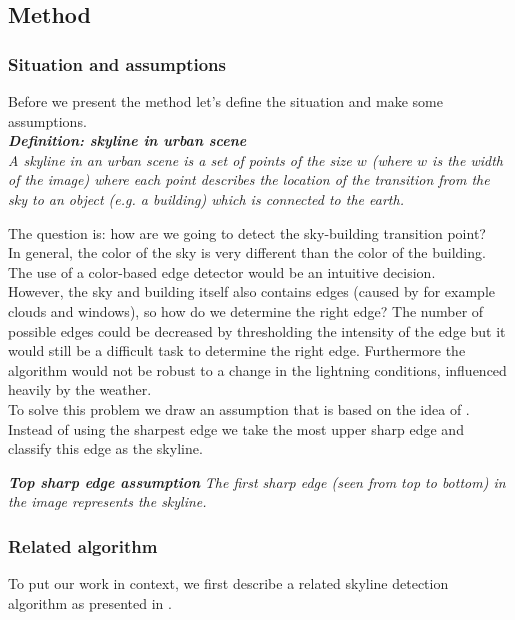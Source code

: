 


\subsection{Method} %
\subsubsection{Situation and assumptions}
Before we present the method let's define the situation and make some
assumptions.\\

\textbf{\emph{Definition: skyline in urban scene}}\\
\emph{A skyline in an urban scene is a set of points of the size $w$ (where $w$ is the
width of the image) where each point describes the location of the
transition from the sky to an object (e.g. a building) which is connected to the
earth.}

The question is: how are we going to detect the sky-building
transition point?\\ 
In general, the color of the sky is very different than the
color of the building. The use of a color-based edge detector would be an
intuitive decision.\\
However, the sky and building itself also contains edges (caused by for example
clouds and windows), so how do we determine the right edge?
The number of possible edges could be decreased by thresholding the intensity of
the edge but it would still be a difficult task to determine the right edge.
Furthermore the algorithm would not be robust to a change in
the lightning conditions, influenced heavily by the weather.\\

To solve this problem we draw an assumption that is based on the
idea of \cite{Rover}. Instead of using the sharpest edge we take the most upper sharp
edge and classify this edge as the skyline.

\textbf{\emph{Top sharp edge assumption}}
\emph{The first sharp edge (seen from top to bottom) in the image 
represents the skyline.}

\subsubsection{Related algorithm}
To put our work in context, we first describe a related skyline detection algorithm as presented in \cite{Rover}.\\

